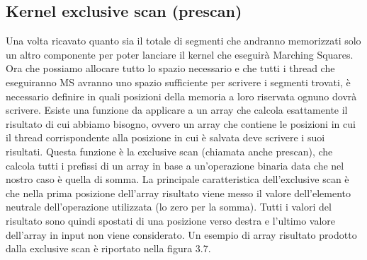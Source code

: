 \documentclass[12pt,a4paper]{report}
\begin{document}
\subsection{Kernel exclusive scan (prescan)}
Una volta ricavato quanto sia il totale di segmenti che andranno memorizzati solo un altro componente per poter lanciare il kernel che eseguirà Marching Squares. \newline
Ora che possiamo allocare tutto lo spazio necessario e che tutti i thread che eseguiranno MS avranno uno spazio sufficiente per scrivere i segmenti trovati, è necessario definire in quali posizioni della memoria a loro riservata ognuno dovrà scrivere. \newline
Esiste una funzione da applicare a un array che calcola esattamente il risultato di cui abbiamo bisogno, ovvero un array che contiene le posizioni in cui il thread corrispondente alla posizione in cui è salvata deve scrivere i suoi risultati.
Questa funzione è la exclusive scan (chiamata anche prescan), che calcola tutti i prefissi di un array in base a un'operazione binaria data che nel nostro caso è quella di somma. \newline
La principale caratteristica dell'exclusive scan è che nella prima posizione dell'array risultato viene messo il valore dell'elemento neutrale dell'operazione utilizzata (lo zero per la somma). Tutti i valori del risultato sono quindi spostati di una posizione verso destra e l'ultimo valore dell'array in input non viene considerato. Un esempio di array risultato prodotto dalla exclusive scan è riportato nella figura 3.7.
\end{document}
